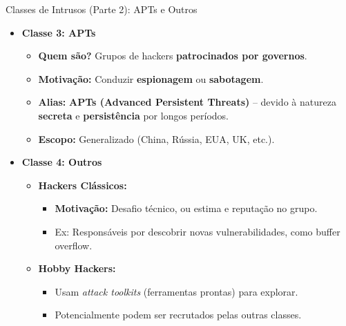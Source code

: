 \begin{frame}{Classes de Intrusos (Parte 2): APTs e Outros}
    \begin{itemize}
        \item \textbf{Classe 3: APTs}
              \begin{itemize}
                  \item \textbf{Quem são?} Grupos de hackers \textbf{patrocinados por governos}.
                  \item \textbf{Motivação:} Conduzir \textbf{espionagem} ou \textbf{sabotagem}.
                  \item \textbf{Alias:} \textbf{APTs (Advanced Persistent Threats)} – devido à natureza \textbf{secreta} e \textbf{persistência} por longos períodos.
                  \item \textbf{Escopo:} Generalizado (China, Rússia, EUA, UK, etc.).
              \end{itemize}

        \item \textbf{Classe 4: Outros}
              \begin{itemize}
                  \item \textbf{Hackers Clássicos:}
                        \begin{itemize}
                            \item \textbf{Motivação:} Desafio técnico, ou estima e reputação no grupo.
                            \item Ex: Responsáveis por descobrir novas vulnerabilidades, como buffer overflow.
                        \end{itemize}
                  \item \textbf{Hobby Hackers:}
                        \begin{itemize}
                            \item Usam \textit{attack toolkits} (ferramentas prontas) para explorar.
                            \item Potencialmente podem ser recrutados pelas outras classes.
                        \end{itemize}
              \end{itemize}
    \end{itemize}
\end{frame}

